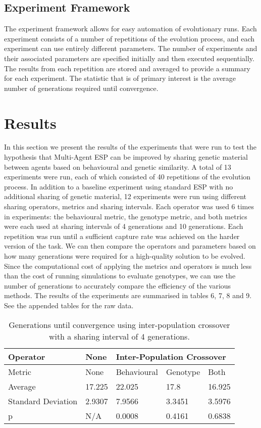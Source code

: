 \documentclass[12pt]{article} %
\begin{document}
\subsection{Experiment Framework}

The experiment framework allows for easy automation of evolutionary runs. Each experiment consists of a number of repetitions of the evolution process, and each experiment can use entirely different parameters. The number of experiments and their associated parameters are specified initially and then executed sequentially. The results from each repetition are stored and averaged to provide a summary for each experiment. The statistic that is of primary interest is the average number of generations required until convergence.

\section{Results}

In this section we present the results of the experiments that were run to test the hypothesis that Multi-Agent ESP can be improved by sharing genetic material between agents based on behavioural and genetic similarity. A total of 13 experiments were run, each of which consisted of 40 repetitions of the evolution process. In addition to a baseline experiment using standard ESP with no additional sharing of genetic material, 12 experiments were run using different sharing operators, metrics and sharing intervals. Each operator was used 6 times in experiments: the behavioural metric, the genotype metric, and both metrics were each used at sharing intervals of 4 generations and 10 generations. Each repetition was run until a sufficient capture rate was achieved on the harder version of the task. We can then compare the operators and parameters based on how many generations were required for a high-quality solution to be evolved. Since the computational cost of applying the metrics and operators is much less than the cost of running simulations to evaluate genotypes, we can use the number of generations to accurately compare the efficiency of the various methods. The results of the experiments are summarised in tables 6, 7, 8 and 9. See the appended tables for the raw data.

\begin{table} \centering
    \begin{tabular}{|l|l|l|l|l|}
    \hline
    Operator			& None	& \multicolumn{3}{l|}{Inter-Population Crossover} \\ \hline
    Metric			& None	& Behavioural	& Genotype	& Both  \\ \hline
    Average			& 17.225	& 22.025		& 17.8		& 16.925 \\ \hline
    Standard Deviation	& 2.9307	& 7.9566		& 3.3451	& 3.5976  \\ \hline
    p 				& N/A 		& 0.0008		& 0.4161	& 0.6838  \\ \hline
    \end{tabular}
    \caption{Generations until convergence using inter-population crossover with a sharing interval of 4 generations.}
\end{table}
\end{document}
